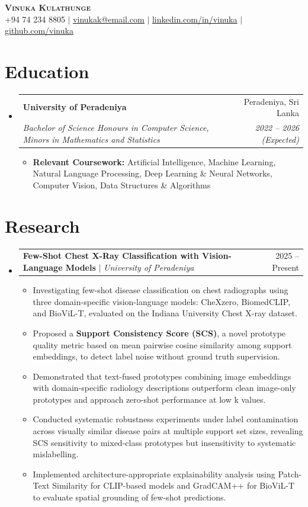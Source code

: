 \documentclass[letterpaper,11pt]{article}
\makeatletter
\newcommand{\resumeItem}[1]{
  \item\small{
    {#1 \vspace{-2pt}}
  }
}
\newcommand{\resumeSubheading}[4]{
  \vspace{-2pt}\item
    \begin{tabular*}{0.97\textwidth}[t]{l@{\extracolsep{\fill}}r}
      \textbf{#1} & #2 \\
      \textit{\small#3} & \textit{\small #4} \\
    \end{tabular*}\vspace{-7pt}
}
\newcommand{\resumeProjectHeading}[2]{
    \item
    \begin{tabular*}{0.97\textwidth}{l@{\extracolsep{\fill}}r}
      \small#1 & #2 \\
    \end{tabular*}\vspace{-7pt}
}
\newcommand{\resumeSubHeadingListStart}{\begin{itemize}[leftmargin=0.15in, label={}]}
\newcommand{\resumeSubHeadingListEnd}{\end{itemize}}
\newcommand{\resumeItemListStart}{\begin{itemize}}
\newcommand{\resumeItemListEnd}{\end{itemize}\vspace{-5pt}}
\makeatother
\begin{document}
\begin{center}
    \textbf{\Huge \scshape Vinuka Kulathunge} \\ \vspace{1pt}
    \small +94 74 234 8805 $|$ \href{mailto:x@x.com}{\underline{vinukak@email.com}} $|$ 
    \href{https://linkedin.com/in/...}{\underline{linkedin.com/in/vinuka}} $|$
    \href{https://github.com/VinukaKulathunge}{\underline{github.com/vinuka}}
\end{center}


\section{Education}
  \resumeSubHeadingListStart
    \resumeSubheading
      {University of Peradeniya}{Peradeniya, Sri Lanka}
      {Bachelor of Science Honours in Computer Science, Minors in Mathematics and Statistics}{2022 -- 2026 (Expected)}
      \resumeItemListStart
        \resumeItem{\textbf{Relevant Coursework:} Artificial Intelligence, Machine Learning, Natural Language Processing, Deep Learning \& Neural Networks, Computer Vision, Data Structures \& Algorithms}
      \resumeItemListEnd
  \resumeSubHeadingListEnd

\section{Research}
    \resumeSubHeadingListStart
      \resumeProjectHeading
          {\textbf{Few-Shot Chest X-Ray Classification with Vision-Language Models} $|$ \emph{University of Peradeniya}}{2025 -- Present}
          \resumeItemListStart
            \resumeItem{Investigating few-shot disease classification on chest radiographs using three domain-specific vision-language models: CheXzero, BiomedCLIP, and BioViL-T, evaluated on the Indiana University Chest X-ray dataset.}
            \resumeItem{Proposed a \textbf{Support Consistency Score (SCS)}, a novel prototype quality metric based on mean pairwise cosine similarity among support embeddings, to detect label noise without ground truth supervision.}
            \resumeItem{Demonstrated that text-fused prototypes combining image embeddings with domain-specific radiology descriptions outperform clean image-only prototypes and approach zero-shot performance at low k values.}
            \resumeItem{Conducted systematic robustness experiments under label contamination across visually similar disease pairs at multiple support set sizes, revealing SCS sensitivity to mixed-class prototypes but insensitivity to systematic mislabelling.}
            \resumeItem{Implemented architecture-appropriate explainability analysis using Patch-Text Similarity for CLIP-based models and GradCAM++ for BioViL-T to evaluate spatial grounding of few-shot predictions.}
          \resumeItemListEnd
    \resumeSubHeadingListEnd
\end{document}
